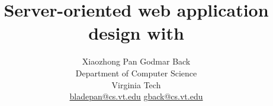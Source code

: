 \documentclass[letterpaper,twocolumn,10pt]{article}
\begin{document}
\newcommand{\apphierarchyfig}{
    \begin{figure}[ht]
    \centering
    \texttt{[image: figs/application\_hierarchy]}
    \caption{Application Hierarchy}
    \label{fig:chatapp}
    \end{figure}
}

\newcommand{\memfig}{
\begin{figure*}[ht]
    \centering
    \texttt{[image: gnuplot/resource\_consumption]}
    \caption{
    Resource Consumption of worker node running JQueryChat Application\\
X axis is time. Left Y axis corresponds to the red line of CPU usage.
Right Y axis corresponds to memory statistics.\\
After about 90s after the system boots up, the benchmark tool starts to simulate 
user workload.
When the benchmark tool sending requests, \emph{HeapUsed} fluctuates as the system creates new objects and garbage collector cleans dead objects.
When the \emph{HeapUsed} drops there is a steep surge of CPU usage, indicating garbage collector is working at that time.
    }
    \label{fig:mem}
\end{figure*}
}

\title{\Large \bf Server-oriented web application design with \cbtwo}

\author{Xiaozhong Pan  \qquad  Godmar Back\\
Department of Computer Science\\ 
Virginia Tech\\
\url{bladepan@cs.vt.edu} \qquad  \url{gback@cs.vt.edu}
}




\maketitle
\thispagestyle{empty}










\newpage

{\footnotesize 
}

\end{document}
